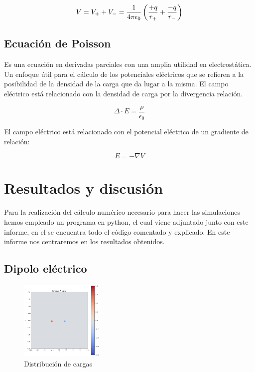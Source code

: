 \documentclass[11pt]{article}
\begin{document}
    \begin{equation}
        \centering
        V = V_{+} + V_{-}=\frac{1}{4\pi\epsilon_{0}}\left ( \frac{+q}{r_{+}}+\frac{-q}{r_{-}}\right )
        \label{Ec:Vdipolo}
    \end{equation}

\subsection{Ecuación de Poisson}
    Es una ecuación en derivadas parciales con una amplia utilidad en electrostática. Un enfoque útil para el cálculo de los potenciales eléctricos que se refieren a la posibilidad de la densidad de la carga que da lugar a la misma.  El campo eléctrico está relacionado con la densidad de carga por la divergencia relación.

    \begin{equation}
        \Delta \cdot E = \frac{\rho}{\epsilon_{0}}
    \end{equation}

    El campo eléctrico está relacionado con el potencial eléctrico de un gradiente de relación:

    \begin{equation}
        E =- \nabla V
    \end{equation}    

\section{Resultados y discusión}
    Para la realización  del cálculo numérico necesario para hacer las simulaciones hemos empleado un programa en python, el cual viene adjuntado junto con este informe, en el se encuentra todo el código comentado y explicado. En este informe nos centraremos en los resultados obtenidos.

\subsection{Dipolo eléctrico}
        \begin{figure}
            \vspace{-0.6cm}
            \centering
            \includegraphics[width=0.36\textwidth]{dipolo1.PNG}
            \caption{Distribución de cargas}
            \label{fig:distr_cargas}
        \end{figure}
   
\end{document}

